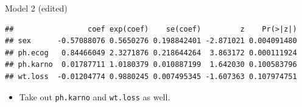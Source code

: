 \begin{frame}[fragile]{Model 2 (edited)}

{\footnotesize  
 
\begin{knitrout}
\color{fgcolor}\begin{kframe}
\begin{alltt}
\hlkwb{=}\hlopt{~}\hlopt{-}\hlopt{-}\hlopt{-}
\hlopt{$}
\end{alltt}
\begin{verbatim}
##                 coef exp(coef)    se(coef)         z    Pr(>|z|)
## sex      -0.57088076 0.5650276 0.198842401 -2.871021 0.004091480
## ph.ecog   0.84466049 2.3271876 0.218644264  3.863172 0.000111924
## ph.karno  0.01787711 1.0180379 0.010887199  1.642030 0.100583796
## wt.loss  -0.01204774 0.9880245 0.007495345 -1.607363 0.107974751
\end{verbatim}
\end{kframe}
\end{knitrout}
}
  
  \begin{itemize}
  \item Take out \texttt{ph.karno} and \texttt{wt.loss} as well.
  \end{itemize}
  
\end{frame}

